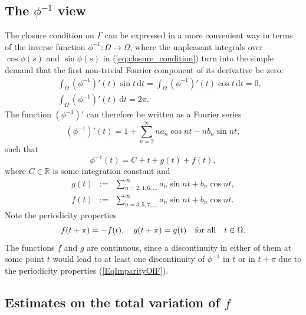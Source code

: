 \documentclass{article}
\newcommand{\dt}{\,\mathrm{d}t}
\newcommand{\R}{\mathbb{R}\xspace}
\begin{document}
\subsection{The $\phi^{-1}$ view}

The closure condition on $\Gamma$ can be expressed in a more convenient way in terms of the inverse function $\phi^{-1}: \Omega\rightarrow \Omega$, where the unpleasant integrals over $\cos\phi(s)$ and $\sin\phi(s)$ in (\ref{eq:closure_condition}) turn into the simple demand that the first non-trivial Fourier component of its derivative be zero:
\begin{eqnarray}
&&\int_\Omega (\phi^{-1})'(t) \sin t \dt =  \int_\Omega (\phi^{-1})'(t) \cos t \dt = 0,\\
&&\int_\Omega (\phi^{-1})'(t) \dt = 2\pi.\nonumber
\end{eqnarray}
The function $(\phi^{-1})'$ can therefore be written as a Fourier series
\begin{equation}
    (\phi^{-1})'(t) = 1 + \sum\limits_{n=2}^\infty n a_n \cos nt - n b_n \sin nt,
\end{equation}
such that
\begin{equation}\label{EqPhi}
\phi^{-1}(t) = C + t + g(t) + f(t),
\end{equation}
where $C\in\R$ is some integration constant and
\begin{eqnarray}
    g(t) &:=& \sum\limits_{n=2,4,6,...}^\infty a_{n} \sin nt + b_{n} \cos nt, \label{eq:DefOfG}\\
    f(t) &:=& \sum\limits_{n=3,5,7,...}^\infty a_{n} \sin nt + b_{n} \cos nt.\label{eq:DefOfF}
\end{eqnarray}
Note the periodicity properties
\begin{equation}\label{EqImparityOfF}
    f(t+\pi) = - f(t),\quad g(t+\pi) = g(t) \quad \textmd{for all}\quad t\in\Omega.
\end{equation}
The functions $f$ and $g$ are continuous, since a discontinuity in either of them at some point $t$  would lead to at least one discontinuity of $\phi^{-1}$ in $t$ or in $t+\pi$ due to the periodicity properties (\ref{EqImparityOfF}).

\subsection{Estimates on the total variation of $f$}
\end{document}
